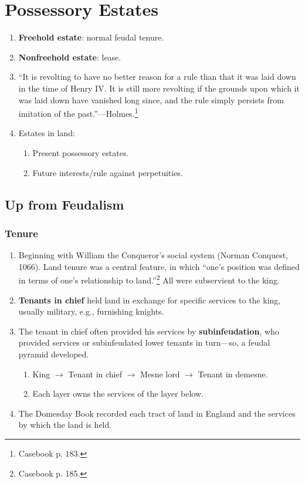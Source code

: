 \section{Possessory Estates}

\begin{enumerate}
    \item \textbf{Freehold estate}: normal feudal tenure.
    \item \textbf{Nonfreehold estate}: lease.
    \item ``It is revolting to have no better reason for a rule than that it 
    was laid down in the time of Henry IV. It is still more revolting if the 
    grounds upon which it was laid down have vanished long since, and the rule 
    simply persists from imitation of the past.''---Holmes.\footnote{Casebook 
    p. 183.}
    \item Estates in land: %
    \begin{enumerate}
        \item Present possessory estates.
        \item Future interests/rule against perpetuities.
    \end{enumerate}
\end{enumerate}

\subsection{Up from Feudalism}

\subsubsection{Tenure}

\begin{enumerate}
    \item Beginning with William the Conqueror's social system (Norman 
    Conquest, 1066). Land tenure was a central feature, in which ``one's 
    position was defined in terms of one's relationship to 
    land.''\footnote{Casebook p. 185.} All were subservient to the king.
    \item \textbf{Tenants in chief} held land in exchange for specific 
    services to the king, usually military, e.g., furnishing knights.
    \item The tenant in chief often provided his services by 
    \textbf{subinfeudation}, who provided services or subinfeudated lower 
    tenants in turn---so, a feudal pyramid developed.
    \begin{enumerate}
        \item King $\rightarrow$ Tenant in chief $\rightarrow$ Mesne lord 
        $\rightarrow$ Tenant in demesne.
        \item Each layer owns the services of the layer below.
    \end{enumerate}
    \item The Domesday Book recorded each tract of land in England and the 
    services by which the land is held.
\end{enumerate}

